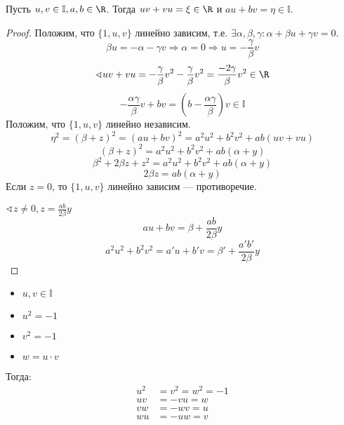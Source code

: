 \begin{lemma}
    Пусть \(u, v \in \mathbb{I}, a, b \in \R\). Тогда \(uv + vu = \xi \in \R\) и \(au + bv = \eta \in \mathbb{I}\).
\end{lemma}
\begin{proof}
    Положим, что \(\{1, u, v\}\) линейно зависим, т.е. \(\exists \alpha, \beta, \gamma : \alpha + \beta u + \gamma v = 0\).
    \[\beta u = - \alpha - \gamma v \Rightarrow \alpha = 0 \Rightarrow u = - \frac{\gamma}{\beta} v\]
    \[\sphericalangle uv + vu = - \frac{\gamma}{\beta}v^2 - \frac{\gamma}{\beta}v^2 = \frac{-2\gamma}{\beta}v^2 \in \R\]
    \[- \frac{\alpha \gamma}{\beta} v + bv = \left(b - \frac{\alpha\gamma}{\beta}\right)v \in \mathbb{I}\]
    Положим, что \(\{1, u, v\}\) линейно независим.
    \[\eta^2 = (\beta + z)^2 = (au + bv)^2 = a^2u^2 + b^2v^2 + ab(uv + vu)\]
    \[(\beta + z)^2 = a^2u^2 + b^2v^2 + ab(\alpha + y)\]
    \[\beta^2 + 2\beta z + z^2 = a^2u^2 + b^2v^2 + ab(\alpha + y)\]
    \[2\beta z = ab(\alpha + y)\]
    Если \(z = 0\), то \(\{1, u, v\}\) линейно зависим --- противоречие.

    \(\sphericalangle z \neq 0, z = \frac{ab}{2\beta} y\)
    \[au + bv = \beta + \frac{ab}{2 \beta}y\]
    \[a^2u^2 + b^2v^2 = a'u + b'v = \beta' + \frac{a'b'}{2 \beta}y\]
    \unfinished
\end{proof}

\begin{lemma}\itemfix
    \begin{itemize}
        \item \(u, v \in \mathbb{I}\)
        \item \(u^2 = - 1\)
        \item \(v^2 = - 1\)
        \item \(w = u \cdot v\)
    \end{itemize}

    Тогда:
    \begin{align*}
        u^2 & = v^2 = w^2 = - 1 \\
        uv  & = - vu = w        \\
        vw  & = - wv = u        \\
        wu  & = - uw = v
    \end{align*}
\end{lemma}
